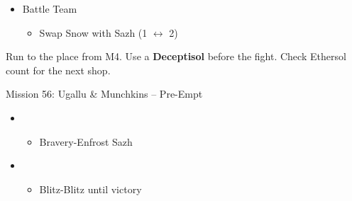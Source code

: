 \begin{menu}
	\begin{itemize}
	\paradigm
		\begin{itemize}
			\item Battle Team
				\begin{itemize}
					\item Swap Snow with Sazh (1 $\leftrightarrow$ 2)
				\end{itemize}
		\end{itemize}
	\end{itemize}
\end{menu}

Run to the place from M4.
Use a \textbf{Deceptisol} before the fight.
Check Ethersol count for the next shop.

\begin{battle}{Mission 56: Ugallu \& Munchkins -- Pre-Empt}
	\begin{itemize}
		\item \fifth
			\begin{itemize}
				\item Bravery-Enfrost Sazh
			\end{itemize}
		\item \first
			\begin{itemize}
				\item Blitz-Blitz until victory
			\end{itemize}
	\end{itemize}
\end{battle}

